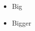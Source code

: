 \documentclass[20pt,t]{beamer}
\begin{document}
\begin{frame}
\begin{itemize}
\item Big
\item Bigger
\end{itemize}
\end{frame}
\end{document}
